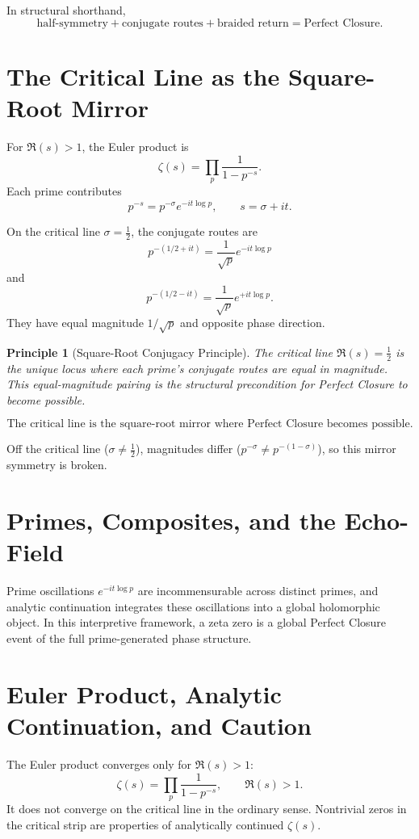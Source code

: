 \documentclass[11pt]{article}
\newtheorem{principle}[definition]{Principle}
\begin{document}
In structural shorthand,
\[
\text{half-symmetry} + \text{conjugate routes} + \text{braided return} = \text{Perfect Closure}.
\]

\section{The Critical Line as the Square-Root Mirror}

For $\Re(s)>1$, the Euler product is
\[
\zeta(s)=\prod_p \frac{1}{1-p^{-s}}.
\]
Each prime contributes
\[
p^{-s}=p^{-\sigma}e^{-it\log p},\qquad s=\sigma+it.
\]

On the critical line $\sigma=\tfrac{1}{2}$, the conjugate routes are
\[
p^{-(1/2+it)} = \frac{1}{\sqrt p}e^{-it\log p}
\]
and
\[
p^{-(1/2-it)} = \frac{1}{\sqrt p}e^{+it\log p}.
\]
They have equal magnitude $1/\sqrt p$ and opposite phase direction.

\begin{principle}[Square-Root Conjugacy Principle]
The critical line $\Re(s)=\tfrac{1}{2}$ is the unique locus where each prime's conjugate routes are equal in magnitude. This equal-magnitude pairing is the structural precondition for Perfect Closure to become possible.
\end{principle}

\[
\boxed{\text{The critical line is the square-root mirror where Perfect Closure becomes possible.}}
\]

Off the critical line ($\sigma\neq\tfrac{1}{2}$), magnitudes differ ($p^{-\sigma}\neq p^{-(1-\sigma)}$), so this mirror symmetry is broken.

\section{Primes, Composites, and the Echo-Field}

Prime oscillations $e^{-it\log p}$ are incommensurable across distinct primes, and analytic continuation integrates these oscillations into a global holomorphic object. In this interpretive framework, a zeta zero is a global Perfect Closure event of the full prime-generated phase structure.

\section{Euler Product, Analytic Continuation, and Caution}

The Euler product converges only for $\Re(s)>1$:
\[
\zeta(s)=\prod_p\frac{1}{1-p^{-s}},\qquad \Re(s)>1.
\]
It does not converge on the critical line in the ordinary sense. Nontrivial zeros in the critical strip are properties of analytically continued $\zeta(s)$.
\end{document}
